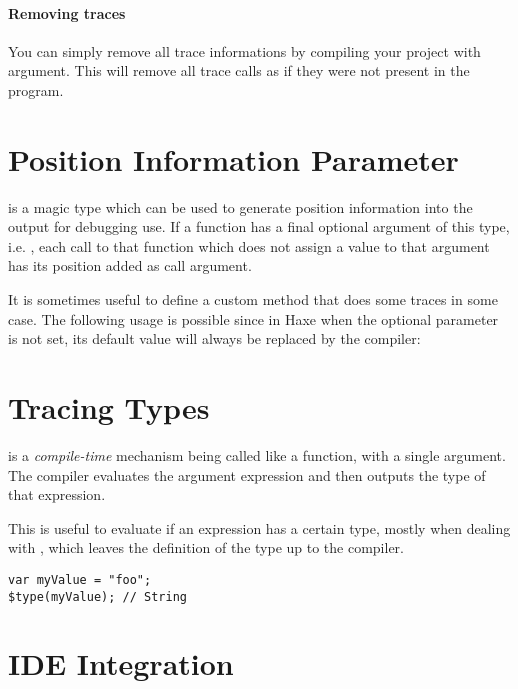 \paragraph{Removing traces}

You can simply remove all trace informations by compiling your project with  argument. This will remove all trace calls as if they were not present in the program.

\section{Position Information Parameter}
\label{debugging-posinfos}

\href{http://api.haxe.org/haxe/PosInfos.html}{} is a magic type which can be used to generate position information into the output for debugging use.
If a function has a final optional argument of this type, i.e. , each call to that function which does not assign a value to that argument has its position added as call argument. 

It is sometimes useful to define a custom method that does some traces in some case. The following usage is possible since in Haxe when the  optional parameter is not set, its default value will always be replaced by the compiler:


\section{Tracing Types}
\label{debugging-type-function}

 is a \emph{compile-time} mechanism being called like a function, with a single argument. The compiler evaluates the argument expression and then outputs the type of that expression.

This is useful to evaluate if an expression has a certain type, mostly when dealing with , which leaves the definition of the type up to the compiler.

\begin{lstlisting}
var myValue = "foo";
$type(myValue); // String
\end{lstlisting}


\section{IDE Integration}
\label{debugging-ide-integration}

